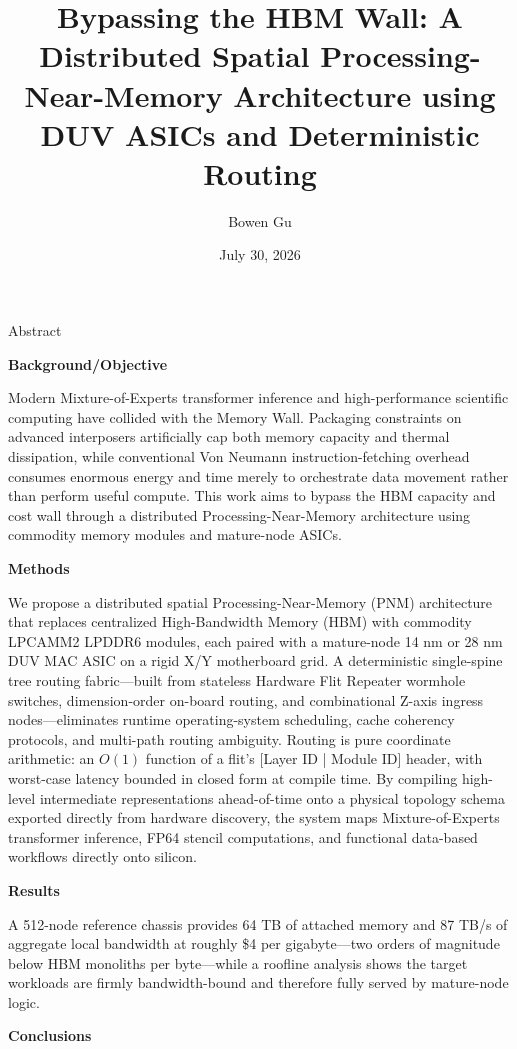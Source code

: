 \documentclass[10pt,twocolumn]{article}
\title{Bypassing the HBM Wall: A Distributed Spatial Processing-Near-Memory Architecture using DUV ASICs and Deterministic Routing}
\author{Bowen Gu}
\date{July 30, 2026}
\begin{document}
\maketitle
\thispagestyle{empty}

Abstract

\textbf{Background/Objective}

Modern Mixture-of-Experts transformer inference and high-performance scientific computing have collided with the Memory Wall\cite{1}. Packaging constraints on advanced interposers artificially cap both memory capacity and thermal dissipation, while conventional Von Neumann instruction-fetching overhead consumes enormous energy and time merely to orchestrate data movement rather than perform useful compute\cite{6}. This work aims to bypass the HBM capacity and cost wall through a distributed Processing-Near-Memory architecture using commodity memory modules and mature-node ASICs.

\textbf{Methods}

We propose a distributed spatial Processing-Near-Memory (PNM) architecture that replaces centralized High-Bandwidth Memory (HBM)\cite{15} with commodity LPCAMM2 LPDDR6 modules\cite{16,17}, each paired with a mature-node 14 nm or 28 nm DUV MAC ASIC on a rigid X/Y motherboard grid. A deterministic single-spine tree routing fabric---built from stateless Hardware Flit Repeater wormhole switches, dimension-order on-board routing, and combinational Z-axis ingress nodes---eliminates runtime operating-system scheduling, cache coherency protocols, and multi-path routing ambiguity\cite{13,14}. Routing is pure coordinate arithmetic: an $O(1)$ function of a flit's [Layer ID | Module ID] header, with worst-case latency bounded in closed form at compile time. By compiling high-level intermediate representations ahead-of-time onto a physical topology schema exported directly from hardware discovery, the system maps Mixture-of-Experts transformer inference, FP64 stencil computations, and functional data-based workflows directly onto silicon\cite{3,4}.

\textbf{Results}

A 512-node reference chassis provides 64 TB of attached memory and 87 TB/s of aggregate local bandwidth at roughly \$4 per gigabyte---two orders of magnitude below HBM monoliths per byte---while a roofline analysis shows the target workloads are firmly bandwidth-bound and therefore fully served by mature-node logic\cite{5}.

\textbf{Conclusions}
\end{document}
